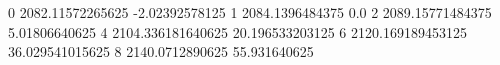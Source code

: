 0 2082.11572265625 -2.02392578125
1 2084.1396484375 0.0
2 2089.15771484375 5.01806640625
4 2104.336181640625 20.196533203125
6 2120.169189453125 36.029541015625
8 2140.0712890625 55.931640625
